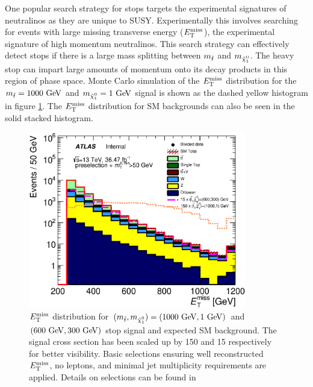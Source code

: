 \indent One popular search strategy for stops targets the experimental signatures of neutralinos as they are unique to SUSY.  Experimentally this involves searching for events with large missing transverse energy ($E_{\mathrm{T}}^{\mathrm{miss}}$), the experimental signature of high momentum neutralinos.  This search strategy can effectively detect stops if there is a large mass splitting between $m_{\tilde{t}}$ and $m_{\ninoone}$. The heavy stop can impart large amounts of momentum onto its decay products in this region of phase space.  Monte Carlo simulation of the $E_{\mathrm{T}}^{\mathrm{miss}}$ distribution for the $m_{\stop} = 1000 \gev$ and $m_{\ninoone} = 1 \gev$ signal is shown as the dashed yellow histogram in figure \ref{fig:presel:MET}.  The $E_{\mathrm{T}}^{\mathrm{miss}}$ distribution for SM backgrounds can also be seen in the solid stacked histogram.  \\

\begin{figure}[h!]
\centering
    \includegraphics[width=0.85\textwidth]{figures/preselection/Met_preCutSRPlot_withRatio_log.eps}\hspace{0.05\textwidth}
\caption{ $E_{\mathrm{T}}^{\mathrm{miss}}$ distribution for $(m_{\stop}, m_{\ninoone}) = (1000 \gev,1 \gev)$ and $(600 \gev, 300 \gev)$ stop signal and expected SM background.  The signal cross section has been scaled up by 150 and 15 respectively for better visibility.  Basic selections ensuring well reconstructed $E_{\mathrm{T}}^{\mathrm{miss}}$, no leptons, and minimal jet multiplicity requirements are applied.  Details on selections can be found in \cite{stop0LCONF} }
\label{fig:presel:MET}
\end{figure}

